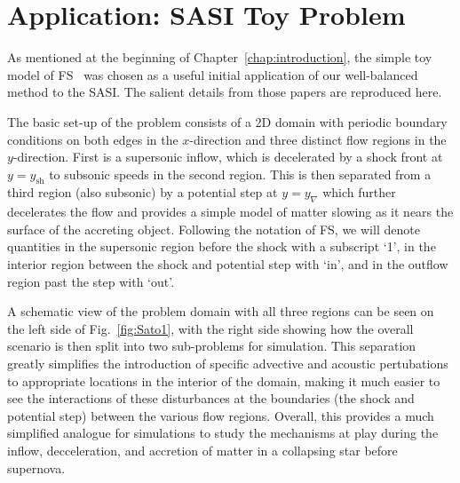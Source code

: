 \chapter{Application: SASI Toy Problem}
\label{chap:application}

As mentioned at the beginning of Chapter~\ref{chap:introduction}, the simple toy model of FS~\cite{Foglizzo2009,Sato2009} was chosen as a useful initial application of our well-balanced method to the SASI. The salient details from those papers are reproduced here.

The basic set-up of the problem consists of a 2D domain with periodic boundary conditions on both edges in the $x$-direction and three distinct flow regions in the $y$-direction. First is a supersonic inflow, which is decelerated by a shock front at $y=y_\textrm{sh}$ to subsonic speeds in the second region. This is then separated from a third region (also subsonic) by a potential step at $y=y_\nabla$ which further decelerates the flow and provides a simple model of matter slowing as it nears the surface of the accreting object. Following the notation of FS, we will denote quantities in the supersonic region before the shock with a subscript `1', in the interior region between the shock and potential step with `in', and in the outflow region past the step with `out'.

A schematic view of the problem domain with all three regions can be seen on the left side of Fig.~\ref{fig:Sato1}, with the right side showing how the overall scenario is then split into two sub-problems for simulation. This separation greatly simplifies the introduction of specific advective and acoustic pertubations to appropriate locations in the interior of the domain, making it much easier to see the interactions of these disturbances at the boundaries (the shock and potential step) between the various flow regions. Overall, this provides a much simplified analogue for simulations to study the mechanisms at play during the inflow, decceleration, and accretion of matter in a collapsing star before supernova.

